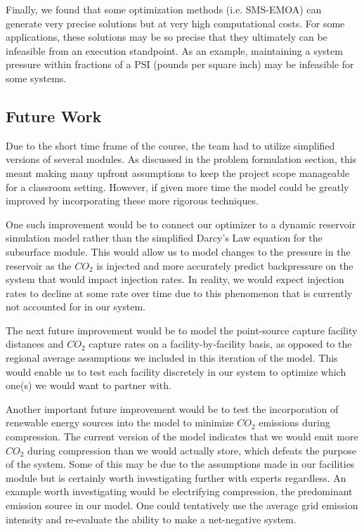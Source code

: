 \documentclass[balance,upint,subscriptcorrection,varvw,mathalfa=cal=boondoxo,spanish,french,vietnamese,russian,greek,pdf-a,colorlinks]{asmeconf}
\begin{document}
Finally, we found that some optimization methods (i.e. SMS-EMOA) can generate very precise solutions but at very high computational costs.  For some applications, these solutions may be so precise that they ultimately can be infeasible from an execution standpoint.  As an example, maintaining a system pressure within fractions of a PSI (pounds per square inch) may be infeasible for some systems.


\subsection{Future Work}
Due to the short time frame of the course, the team had to utilize simplified versions of several modules. As discussed in the problem formulation section, this meant making many upfront assumptions to keep the project scope manageable for a classroom setting. However, if given more time the model could be greatly improved by incorporating these more rigorous techniques.

One such improvement would be to connect our optimizer to a dynamic reservoir simulation model rather than the simplified Darcy's Law equation for the subsurface module. This would allow us to model changes to the pressure in the reservoir as the $CO_{2}$ is injected and more accurately predict backpressure on the system that would impact injection rates. In reality, we would expect injection rates to decline at some rate over time due to this phenomenon that is currently not accounted for in our system.

The next future improvement would be to model the point-source capture facility distances and $CO_{2}$ capture rates on a facility-by-facility basis, as opposed to the regional average assumptions we included in this iteration of the model. This would enable us to test each facility discretely in our system to optimize which one(s) we would want to partner with.

Another important future improvement would be to test the incorporation of renewable energy sources into the model to minimize $CO_{2}$ emissions during compression. The current version of the model indicates that we would emit more $CO_{2}$ during compression than we would actually store, which defeats the purpose of the system. Some of this may be due to the assumptions made in our facilities module but is certainly worth investigating further with experts regardless. An example worth investigating would be electrifying compression, the predominant emission source in our model. One could tentatively use the average grid emission intensity and re-evaluate the ability to make a net-negative system.
\end{document}
